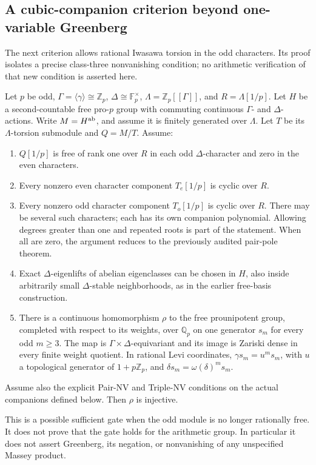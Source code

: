 \subsection{A cubic-companion criterion beyond one-variable Greenberg}
\label{sec:odd-torsion-cubic}


The next criterion allows rational Iwasawa torsion in the odd characters.
Its proof isolates a precise class-three nonvanishing condition; no arithmetic
verification of that new condition is asserted here.


\begin{theorem}
\label{thm:odd-torsion-cubic}

Let \(p\) be odd, \(\Gamma=\langle\gamma\rangle\cong\mathbb Z_p\), \(\Delta\cong\mathbb F_p^\times\), \(\Lambda=\mathbb Z_p[[\Gamma]]\), and \(R=\Lambda[1/p]\). Let \(H\) be a second-countable free pro-\(p\) group with commuting continuous \(\Gamma\)- and \(\Delta\)-actions. Write \(M=H^{\rm ab}\), and assume it is finitely generated over \(\Lambda\). Let \(T\) be its \(\Lambda\)-torsion submodule and \(Q=M/T\). Assume:

\begin{enumerate}
\item \(Q[1/p]\) is free of rank one over \(R\) in each odd \(\Delta\)-character and zero in the even characters.
\item Every nonzero even character component \(T_e[1/p]\) is cyclic over \(R\).
\item Every nonzero odd character component \(T_o[1/p]\) is cyclic over \(R\). There may be several such characters; each has its own companion polynomial. Allowing degrees greater than one and repeated roots is part of the statement. When all are zero, the argument reduces to the previously audited pair-pole theorem.
\item Exact \(\Delta\)-eigenlifts of abelian eigenclasses can be chosen in \(H\), also inside arbitrarily small \(\Delta\)-stable neighborhoods, as in the earlier free-basis construction.
\item There is a continuous homomorphism \(\rho\) to the free prounipotent group, completed with respect to its weights, over \(\mathbb Q_p\) on one generator \(s_m\) for every odd \(m\ge3\). The map is \(\Gamma\times\Delta\)-equivariant and its image is Zariski dense in every finite weight quotient. In rational Levi coordinates, \(\gamma s_m=u^m s_m\), with \(u\) a topological generator of \(1+p\mathbb Z_p\), and \(\delta s_m=\omega(\delta)^m s_m\).
\end{enumerate}

Assume also the explicit Pair-NV and Triple-NV conditions on the actual companions defined below. Then \(\rho\) is injective.

\end{theorem}
This is a possible sufficient gate when the odd module is no longer rationally free. It does not prove that the gate holds for the arithmetic group. In particular it does not assert Greenberg, its negation, or nonvanishing of any unspecified Massey product.

